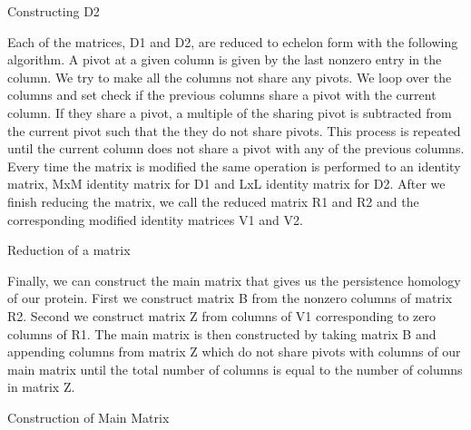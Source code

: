 \documentclass[12pt, a4paper, twocolumn, fullpage]{article}
\theoremstyle{plain}
\theoremstyle{definition}
\theoremstyle{remark}
\begin{document}
\begin{algorithm}
\caption{Constructing D2}
\begin{algorithmic}
\ENDFOR
\end{algorithmic}
\end{algorithm}

Each of the matrices, D1 and D2, are reduced to echelon form with the following algorithm. A pivot at a given column is given by the last nonzero entry in the column. We try to make all the columns not share any pivots. We loop over the columns and set check if the previous columns share a pivot with the current column. If they share a pivot, a multiple of the sharing pivot is subtracted from the current pivot such that the they do not share pivots. This process is repeated until the current column does not share a pivot with any of the previous columns. Every time the matrix is modified the same operation is performed to an identity matrix, MxM identity matrix for D1 and LxL identity matrix for D2. After we finish reducing the matrix, we call the reduced matrix R1 and R2 and the corresponding modified identity matrices V1 and V2.

\begin{algorithm}
\caption{Reduction of a matrix}
\begin{algorithmic}
        \ENDIF
    \ENDFOR 
\ENDFOR
\end{algorithmic}
\end{algorithm}

Finally, we can construct the main matrix that gives us the persistence homology of our protein. First we construct matrix B from the nonzero columns of matrix R2.  Second we construct matrix Z from columns of V1 corresponding to zero columns of R1. The main matrix is then constructed by taking matrix B and appending columns from matrix Z which do not share pivots with columns of our main matrix until the total number of columns is equal to the number of columns in matrix Z.

\begin{algorithm}
\caption{Construction of Main Matrix}
\begin{algorithmic}
    \ENDIF
    \ENDIF
\ENDFOR
\end{algorithmic}
\end{algorithm}
\end{document}
